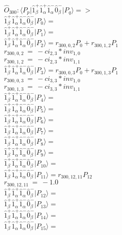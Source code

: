 \documentclass[14pt]{article}
\begin{document}
    $\hat{O}_{300}:  \langle{P_p}\vert \hat{1}_{\beta}^{+}\hat{1}_{\alpha}^{+}\hat{1}_{\alpha}^{-}\hat{0}_{\beta}^{-} \vert{P_q}\rangle => $ \\ 
    $ \hat{1}_{\beta}^{+}\hat{1}_{\alpha}^{+}\hat{1}_{\alpha}^{-}\hat{0}_{\beta}^{-} \vert{P_{0}}\rangle =  $ \\ 
    $ \hat{1}_{\beta}^{+}\hat{1}_{\alpha}^{+}\hat{1}_{\alpha}^{-}\hat{0}_{\beta}^{-} \vert{P_{1}}\rangle =  $ \\ 
    $ \hat{1}_{\beta}^{+}\hat{1}_{\alpha}^{+}\hat{1}_{\alpha}^{-}\hat{0}_{\beta}^{-} \vert{P_{2}}\rangle = {r}_{300,0,2}P_{0}+{r}_{300,1,2}P_{1} $ \\ 
    ${r}_{300,0,2}\ =\ -{ci}_{2,3}*{inv}_{1,0} $ \\ 
    ${r}_{300,1,2}\ =\ -{ci}_{2,3}*{inv}_{1,1} $ \\ 
    $ \hat{1}_{\beta}^{+}\hat{1}_{\alpha}^{+}\hat{1}_{\alpha}^{-}\hat{0}_{\beta}^{-} \vert{P_{3}}\rangle = {r}_{300,0,3}P_{0}+{r}_{300,1,3}P_{1} $ \\ 
    ${r}_{300,0,3}\ =\ -{ci}_{3,3}*{inv}_{1,0} $ \\ 
    ${r}_{300,1,3}\ =\ -{ci}_{3,3}*{inv}_{1,1} $ \\ 
    $ \hat{1}_{\beta}^{+}\hat{1}_{\alpha}^{+}\hat{1}_{\alpha}^{-}\hat{0}_{\beta}^{-} \vert{P_{4}}\rangle =  $ \\ 
    $ \hat{1}_{\beta}^{+}\hat{1}_{\alpha}^{+}\hat{1}_{\alpha}^{-}\hat{0}_{\beta}^{-} \vert{P_{5}}\rangle =  $ \\ 
    $ \hat{1}_{\beta}^{+}\hat{1}_{\alpha}^{+}\hat{1}_{\alpha}^{-}\hat{0}_{\beta}^{-} \vert{P_{6}}\rangle =  $ \\ 
    $ \hat{1}_{\beta}^{+}\hat{1}_{\alpha}^{+}\hat{1}_{\alpha}^{-}\hat{0}_{\beta}^{-} \vert{P_{7}}\rangle =  $ \\ 
    $ \hat{1}_{\beta}^{+}\hat{1}_{\alpha}^{+}\hat{1}_{\alpha}^{-}\hat{0}_{\beta}^{-} \vert{P_{8}}\rangle =  $ \\ 
    $ \hat{1}_{\beta}^{+}\hat{1}_{\alpha}^{+}\hat{1}_{\alpha}^{-}\hat{0}_{\beta}^{-} \vert{P_{9}}\rangle =  $ \\ 
    $ \hat{1}_{\beta}^{+}\hat{1}_{\alpha}^{+}\hat{1}_{\alpha}^{-}\hat{0}_{\beta}^{-} \vert{P_{10}}\rangle =  $ \\ 
    $ \hat{1}_{\beta}^{+}\hat{1}_{\alpha}^{+}\hat{1}_{\alpha}^{-}\hat{0}_{\beta}^{-} \vert{P_{11}}\rangle = {r}_{300,12,11}P_{12} $ \\ 
    ${r}_{300,12,11}\ =\ -1.0 $ \\ 
    $ \hat{1}_{\beta}^{+}\hat{1}_{\alpha}^{+}\hat{1}_{\alpha}^{-}\hat{0}_{\beta}^{-} \vert{P_{12}}\rangle =  $ \\ 
    $ \hat{1}_{\beta}^{+}\hat{1}_{\alpha}^{+}\hat{1}_{\alpha}^{-}\hat{0}_{\beta}^{-} \vert{P_{13}}\rangle =  $ \\ 
    $ \hat{1}_{\beta}^{+}\hat{1}_{\alpha}^{+}\hat{1}_{\alpha}^{-}\hat{0}_{\beta}^{-} \vert{P_{14}}\rangle =  $ \\ 
    $ \hat{1}_{\beta}^{+}\hat{1}_{\alpha}^{+}\hat{1}_{\alpha}^{-}\hat{0}_{\beta}^{-} \vert{P_{15}}\rangle =  $ \\ 
    
\end{document}
